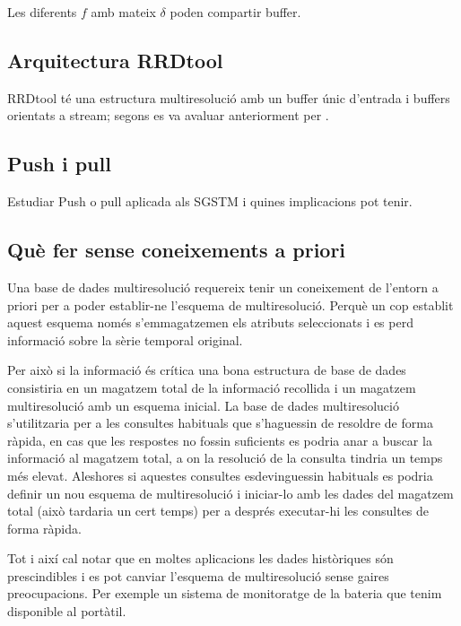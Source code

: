Les diferents $f$ amb mateix $\delta$ poden compartir buffer.





\subsection{Arquitectura RRDtool}


RRDtool té una estructura multiresolució amb un buffer únic d'entrada
i buffers orientats a stream; segons es va avaluar anteriorment per
\textcite{llusa11:tfm}.


\subsection{Push i pull}

Estudiar Push o pull aplicada als SGSTM i quines implicacions pot tenir.


\subsection{Què fer sense coneixements a priori}

Una base de dades multiresolució requereix tenir un coneixement de l'entorn a priori per a poder establir-ne l'esquema de multiresolució. Perquè un cop establit aquest esquema només s'emmagatzemen els atributs seleccionats i es perd informació sobre la sèrie temporal original.

Per això si la informació és crítica una bona estructura de base de dades consistiria en un magatzem total de la informació recollida i un magatzem multiresolució amb un esquema inicial. La base de dades multiresolució s'utilitzaria per a les consultes habituals que s'haguessin de resoldre de forma ràpida, en cas que les respostes no fossin suficients es podria anar a buscar la informació al magatzem total, a on la resolució de la consulta tindria un temps més elevat. 
Aleshores si aquestes consultes esdevinguessin habituals es podria definir un nou esquema de multiresolució i iniciar-lo amb les dades del magatzem total (això tardaria un cert temps) per a després executar-hi les consultes de forma ràpida.


Tot i així cal notar que en moltes aplicacions les dades històriques
són prescindibles i es pot canviar l'esquema de multiresolució sense
gaires preocupacions. Per exemple un sistema de monitoratge de la
bateria que tenim disponible al portàtil.

 









